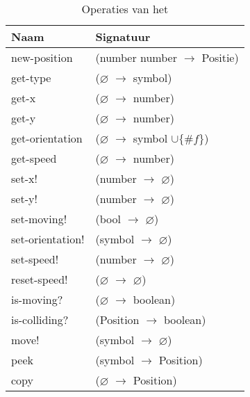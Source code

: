 \begin{table}[hbt]
\centering
\begin{tabular}{|ll|}
\hline
\rowcolor[HTML]{000000} 
{\color[HTML]{FFFFFF} \textbf{Naam}} & {\color[HTML]{FFFFFF} \textbf{Signatuur}} \\ \hline
new-position     & (number number $\rightarrow$ Positie)                       \\ \hline
get-type         & ($\varnothing$ $\rightarrow$ symbol)                        \\ \hline
get-x            & ($\varnothing$ $\rightarrow$ number)                        \\ \hline
get-y            & ($\varnothing$ $\rightarrow$ number)                        \\ \hline
get-orientation  & ($\varnothing$ $\rightarrow$ symbol $\cup\{\#f\}$)          \\ \hline
get-speed        & ($\varnothing$ $\rightarrow$ number)                        \\ \hline
set-x!           & (number $\rightarrow$ $\varnothing$)                        \\ \hline
set-y!           & (number $\rightarrow$ $\varnothing$)                        \\ \hline
set-moving!      & (bool $\rightarrow$ $\varnothing$)                          \\ \hline
set-orientation! & (symbol $\rightarrow$ $\varnothing$)                        \\ \hline
set-speed!       & (number $\rightarrow$ $\varnothing$)                        \\ \hline
reset-speed!     & ($\varnothing$ $\rightarrow$ $\varnothing$)                 \\ \hline
is-moving?       & ($\varnothing$ $\rightarrow$ boolean)                       \\ \hline
is-colliding?    & (Position $\rightarrow$ boolean)                            \\ \hline
move!            & (symbol $\rightarrow$ $\varnothing$)                        \\ \hline
peek             & (symbol $\rightarrow$ Position)                             \\ \hline
copy             & ($\varnothing$ $\rightarrow$ Position)                      \\ \hline
\end{tabular}
\caption{Operaties van het \texttt{}}
\label{table:positie}
\end{table}

